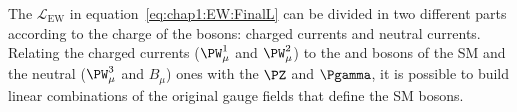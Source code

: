 
The $\mathcal{L}_{\text{EW}}$ in equation~\ref{eq:chap1:EW:FinalL} can be divided in two different parts according 
to the charge of the bosons: charged currents and neutral currents.
Relating the charged currents ($\PW^{1}_{\mu}$ and $\PW^{2}_{\mu}$) to the \PWplus and \PWminus 
bosons of the SM and the neutral ($\PW^{3}_{\mu}$ and $B_\mu$) ones with the $\PZ$ and $\Pgamma$, 
it is possible to build linear combinations of the original gauge fields that define the SM bosons.



